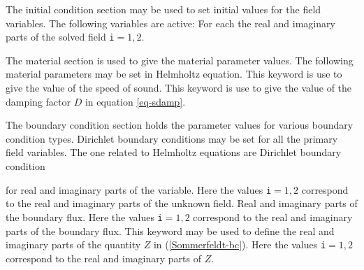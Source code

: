 The initial condition section may be used to set initial values for the field
variables. The following variables are active:
\sifbegin
{} 
For each the real and imaginary parts of the solved field {\tt i}$=1,2$.
\sifend

The material section is used to give the material parameter values. The
following material parameters may be set in Helmholtz equation.
\sifbegin
{} 
This keyword is use to give the value of the speed of sound.
This keyword is use to give the value of the damping factor $D$ in
equation \ref{eq-sdamp}.
\sifend


The boundary condition section holds the parameter values for various
boundary condition types. Dirichlet boundary conditions may be
set for all the primary field variables. The one related to Helmholtz equations
are
\sifbegin
{} 
Dirichlet boundary condition

for real and imaginary parts of the variable.
Here the values {\tt i}$=1,2$ correspond to the real and 
imaginary parts of the unknown field.
Real and imaginary parts of the boundary flux.
Here the values {\tt i}$=1,2$ correspond to the real and 
imaginary parts of the boundary flux.
This keyword may be used to define the real and imaginary parts of
the quantity $Z$ in (\ref{Sommerfeldt-bc}).
Here the values {\tt i}$=1,2$ correspond to the real and 
imaginary parts of $Z$.
\sifend
\sifend


%
%
